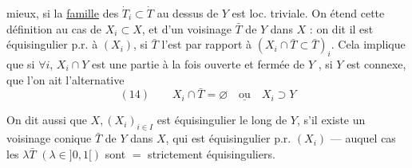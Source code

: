 mieux, si la \uline{famille} des $\dot T_i\subset\dot T$ au dessus
de $Y$ est  loc. triviale. On étend cette
définition au cas de $X_i\subset X$, et d'un
voisinage  $\bar T$ de $Y$ dans $X$ :
on dit
il est équisingulier p.r. à $(X_i)$, si $\bar T$
l'est par rapport à $(X_i\cap\bar T\subset\bar T)_i$.
Cela
implique  que si $\forall i$, $X_i\cap Y$ est une
partie à la fois ouverte et fermée de $Y$
, si $Y$ est connexe, que 
l'on ait l'alternative
\[
(14)\qquad X_i\cap\bar T=\varnothing\quad\underline{\text{ou}}\quad X_i\supset Y
\]
\margin{on dit qu'il est \uline{strictement équisingulier}
si de plus il est \uline{strictement} \unsure{compatible avec tous}
les $X_i$.
Si $\bar T$ équisingulier p.r. à $(X_i)$,
$\lambda\bar T$ l'est strictement pour $\lambda\in]0,1[$.}

On dit aussi que $X,(X_i)_{i\in I}$ est
 équisingulier
le long de $Y$, s'il existe un voisinage conique
 $\bar T$ de $Y$ dans $X$, qui est équisingulier
p.r.  $(X_i)$ --- auquel cas les $\lambda\bar T$
$(\lambda\in]0,1[)$ sont $=$ strictement équisinguliers.
